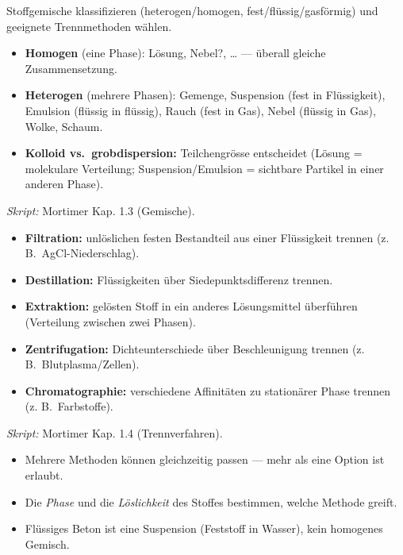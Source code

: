 

Stoffgemische klassifizieren (heterogen/homogen, fest/flüssig/gasförmig) und
geeignete Trennmethoden wählen.

\begin{werkzeugkasten}[Gemischtypen]
\begin{itemize}
  \item \textbf{Homogen} (eine Phase): Lösung, Nebel?, \dots{}  --- überall gleiche
        Zusammensetzung.
  \item \textbf{Heterogen} (mehrere Phasen): Gemenge, Suspension (fest in
        Flüssigkeit), Emulsion (flüssig in flüssig), Rauch (fest in Gas),
        Nebel (flüssig in Gas), Wolke, Schaum.
  \item \textbf{Kolloid vs.\ grobdispersion:} Teilchengrösse entscheidet
        (Lösung = molekulare Verteilung; Suspension/Emulsion = sichtbare
        Partikel in einer anderen Phase).
\end{itemize}
\textit{Skript:} Mortimer Kap. 1.3 (Gemische).
\end{werkzeugkasten}

\begin{werkzeugkasten}[Trennmethoden]
\begin{itemize}
  \item \textbf{Filtration:} unlöslichen festen Bestandteil aus einer
        Flüssigkeit trennen (z. B.\ AgCl-Niederschlag).
  \item \textbf{Destillation:} Flüssigkeiten über Siedepunktsdifferenz trennen.
  \item \textbf{Extraktion:} gelösten Stoff in ein anderes Lösungsmittel
        überführen (Verteilung zwischen zwei Phasen).
  \item \textbf{Zentrifugation:} Dichteunterschiede über Beschleunigung
        trennen (z. B.\ Blutplasma/Zellen).
  \item \textbf{Chromatographie:} verschiedene Affinitäten zu stationärer
        Phase trennen (z. B.\ Farbstoffe).
\end{itemize}
\textit{Skript:} Mortimer Kap. 1.4 (Trennverfahren).
\end{werkzeugkasten}

\begin{achtung}
\begin{itemize}
  \item Mehrere Methoden können gleichzeitig passen --- mehr als eine Option
        ist erlaubt.
  \item Die \emph{Phase} und die \emph{Löslichkeit} des Stoffes bestimmen,
        welche Methode greift.
  \item Flüssiges Beton ist eine Suspension (Feststoff in Wasser), kein
        homogenes Gemisch.
\end{itemize}
\end{achtung}
